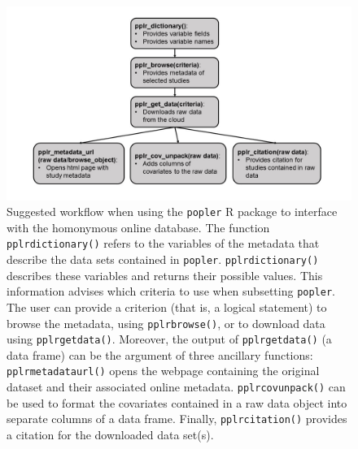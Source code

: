 \documentclass{article}\usepackage[]{graphicx}\usepackage[]{color}
\newcommand{\tom}[1]{{\textit{\color{red}{[#1]}}}}
\begin{document}
\newpage
\begin{figure}[h!]
  \begin{center}
    \includegraphics[scale=0.4]{pack_funs}
    \caption{Suggested workflow when using the \texttt{popler} R package to interface with the homonymous online database. The function \texttt{pplr\textunderscore dictionary()} refers to the variables of the metadata that describe the data sets contained in \texttt{popler}. \texttt{pplr\textunderscore dictionary()} describes these variables and returns their possible values. This information advises which criteria to use when subsetting \texttt{popler}. The user can provide a criterion (that is, a logical statement) to browse the metadata, using \texttt{pplr\textunderscore browse()}, or to download data using \texttt{pplr\textunderscore get\textunderscore data()}. Moreover, the output of \texttt{pplr\textunderscore get\textunderscore data()} (a data frame) can be the argument of three ancillary functions: \texttt{pplr\textunderscore metadata\textunderscore url()} opens the webpage containing the original dataset and their associated online metadata. \texttt{pplr\textunderscore cov\textunderscore unpack()} can be used to format the covariates contained in a raw data object into separate columns of a data frame. Finally, \texttt{pplr\textunderscore citation()} provides a citation for the downloaded data set(s).\tom{I think it would be simpler to cut the fake arguments from the functions in the figure and just show them with no arguments.}}
    \label{Fig:pack_funs}
  \end{center}
\end{figure}

\end{document}

